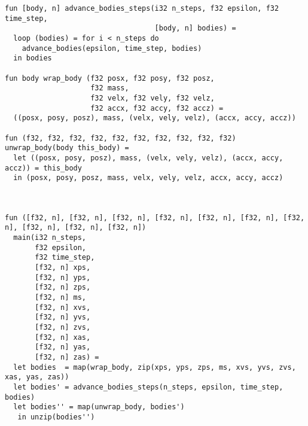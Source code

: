 \begin{lstlisting}
fun [body, n] advance_bodies_steps(i32 n_steps, f32 epsilon, f32 time_step,
                                   [body, n] bodies) =
  loop (bodies) = for i < n_steps do
    advance_bodies(epsilon, time_step, bodies)
  in bodies

fun body wrap_body (f32 posx, f32 posy, f32 posz,
                    f32 mass,
                    f32 velx, f32 vely, f32 velz,
                    f32 accx, f32 accy, f32 accz) =
  ((posx, posy, posz), mass, (velx, vely, velz), (accx, accy, accz))

fun (f32, f32, f32, f32, f32, f32, f32, f32, f32, f32) unwrap_body(body this_body) =
  let ((posx, posy, posz), mass, (velx, vely, velz), (accx, accy, accz)) = this_body
  in (posx, posy, posz, mass, velx, vely, velz, accx, accy, accz)



fun ([f32, n], [f32, n], [f32, n], [f32, n], [f32, n], [f32, n], [f32, n], [f32, n], [f32, n], [f32, n])
  main(i32 n_steps,
       f32 epsilon,
       f32 time_step,
       [f32, n] xps,
       [f32, n] yps,
       [f32, n] zps,
       [f32, n] ms,
       [f32, n] xvs,
       [f32, n] yvs,
       [f32, n] zvs,
       [f32, n] xas,
       [f32, n] yas,
       [f32, n] zas) =
  let bodies  = map(wrap_body, zip(xps, yps, zps, ms, xvs, yvs, zvs, xas, yas, zas))
  let bodies' = advance_bodies_steps(n_steps, epsilon, time_step, bodies)
  let bodies'' = map(unwrap_body, bodies')
   in unzip(bodies'')
\end{lstlisting}
